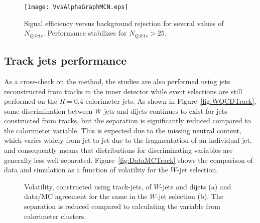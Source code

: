 \begin{figure}[htbp]
\centering
\texttt{[image: VvsAlphaGraphMCN.eps]}
\caption{Signal efficiency versus background rejection for several values of $N_{QJets}$. Performance stabilizes for $N_{QJets} > 25$.}%
\label{fig:SEvsBRQ}
\end{figure}

\subsection{Track jets performance}
\label{app:qjets:jetvol:trackjets}

As a cross-check on the method, the studies are also performed using jets reconstructed from tracks in the inner detector while event selections are still performed on the $R=0.4$ calorimeter jets. As shown in Figure~\ref{fig:WQCDTrack}, some discrimination between $W$-jets and dijets continues to exist for jets constructed from tracks, but the separation is significantly reduced compared to the calorimeter variable. This is expected due to the missing neutral content, which varies widely from jet to jet due to the fragmentation of an individual jet, and consequently means that distributions for discriminating variables are generally less well separated. Figure~\ref{fig:DataMCTrack} shows the comparison of data and simulation as a function of volatility for the $W$-jet selection. %

\begin{figure}[htbp]
\centering
\caption{Volatility, constructed using track-jets, of $W$-jets and dijets (a) and data/MC agreement for the same in the $W$-jet selection (b). The separation is reduced compared to calculating the variable from calorimeter clusters.}
\label{fig:tracks}
\end{figure}

